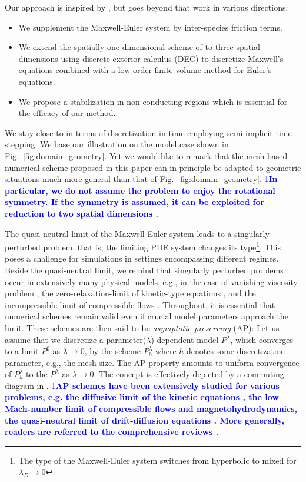 \documentclass{article}
\def\ifUpdate{1}
\newcommand{\review}[1]{\textcolor{blue}{\if\ifUpdate1\textbf{#1}\fi}}
\begin{document}
Our approach is inspired by \cite{degond_2012}, but goes beyond that work in various directions:
\begin{itemize}
\item We supplement the Maxwell-Euler system by inter-species friction terms.
\item We extend the spatially one-dimensional scheme of \cite{degond_2012} to three
  spatial dimensions using discrete exterior calculus (DEC) to discretize Maxwell's
  equations combined with a low-order finite volume method for Euler's equations.
\item We propose a stabilization in non-conducting regions which is essential for the
  efficacy of our method.
\end{itemize}

We stay close to \cite{degond_2012} in terms of discretization in time employing
semi-implicit time-stepping. We base our illustration on the model case shown
in Fig.~\ref{fig:domain_geometry}. Yet we would like to remark that the mesh-based numerical
scheme proposed in this paper can in principle be adapted to geometric situations much
more general than that of Fig.~\ref{fig:domain_geometry}. \review{In particular, we do not 
assume the problem to enjoy the rotational symmetry. If the symmetry is assumed, 
it can be exploited for reduction to two spatial dimensions \cite{bonotto_2022}.}

The quasi-neutral limit of the Maxwell-Euler system leads to a singularly perturbed
problem, that is, the limiting PDE system changes its type\footnote{The type of the
  Maxwell-Euler system switches from hyperbolic to mixed for $\lambda_{D}\to 0$}. This
poses a challenge for simulations in settings encompassing different regimes. 
Beside the quasi-neutral limit, we remind
that singularly perturbed problems occur in extensively many physical models, 
e.g., in the case of vanishing viscosity problem \cite{Kato_1984, bianchini_2005, temam_1997}, the
zero-relaxation-limit of kinetic-type equations \cite{raymond_2009, degond_1996}, and the incompressible limit
of compressible flows \cite{klainerman_1981}. Throughout, it is essential that
numerical schemes remain valid even if crucial model parameters approach the limit. These
schemes are then said to be \emph{asymptotic-preserving} (AP): Let us assume that we
discretize a parameter($\lambda$)-dependent model $P^\lambda$, which converges to a limit
$P^0$ as $\lambda \rightarrow 0$, by the scheme $P^\lambda_h$ where $h$ denotes some
discretization parameter, e.g., the mesh size. The AP property amounts to uniform
convergence of $P^\lambda_h$ to the $P^\lambda$ as $\lambda\rightarrow0$. 
The concept is effectively depicted by a commuting diagram in \cite[][Fig.~1]{jin_2010}. 
\review{AP schemes have been extensively studied for various problems, e.g. the diffusive limit of the kinetic equations \cite{jin_1999, liu_2023}, 
the low Mach-number limit of compressible flows \cite{degond_2007, haack_2010} and magnetohydrodynamics\cite{chen_2023}, 
the quasi-neutral limit of drift-diffusion equations \cite{chatard_2014, claire_2007}. 
More generally, readers are referred to the comprehensive reviews \cite{jin_2010, degond_2017}.}
\end{document}
